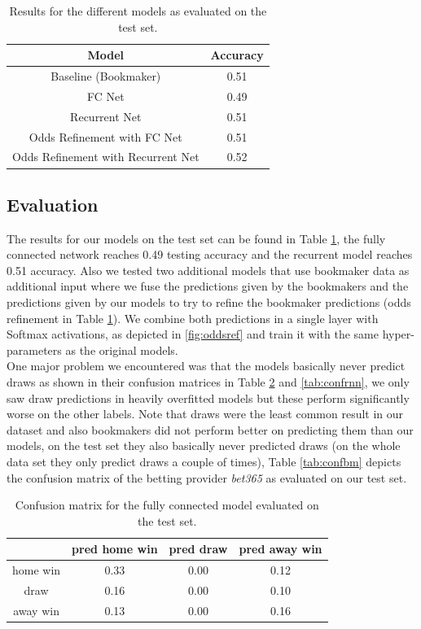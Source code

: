 \documentclass[a4paper]{article}
\begin{document}
\begin{table}
\begin{tabular}{|c|c|}
\hline 
\textbf{Model} & \textbf{Accuracy} \\ 
\hline 
\hline 
Baseline (Bookmaker) & 0.51 \\ 
\hline 
FC Net & 0.49 \\ 
\hline 
Recurrent Net & 0.51 \\ 
\hline 
Odds Refinement with FC Net & 0.51 \\ 
\hline 
Odds Refinement with Recurrent Net & 0.52 \\ 
\hline 
\end{tabular} 
\label{tab:accs}
\caption{Results for the different models as evaluated on the test set.}
\end{table}


\subsection{Evaluation}
The results for our models on the test set can be found in Table \ref{tab:accs},
the fully connected network reaches 0.49 testing accuracy and the recurrent
model reaches 0.51 accuracy. Also we tested two additional models that use
bookmaker data as additional input where we fuse the predictions given by the
bookmakers and the predictions given by our models to try to refine the
bookmaker predictions (odds refinement in Table \ref{tab:accs}). We combine both
predictions in a single layer with Softmax activations, as depicted in
\ref{fig:oddsref} and train it with the same hyper-parameters as the original
models. \\
One major problem we encountered was that the models basically never predict
draws as shown in their confusion matrices in Table \ref{tab:conffc} and
\ref{tab:confrnn}, we only saw draw predictions in heavily overfitted models but
these perform significantly worse on the other labels. Note that draws were the
least common result in our dataset and also bookmakers did not perform better on
predicting them than our models, on the test set they also basically never
predicted draws (on the whole data set they only predict draws a couple of
times), Table \ref{tab:confbm} depicts the confusion matrix of the betting
provider \textit{bet365} as evaluated on our test set.

\begin{table}
\begin{tabular}{|c||c|c|c|}
\hline 
 & pred home win & pred draw  & pred away win \\ 
\hline 
\hline
home win & 0.33 & 0.00 & 0.12 \\ 
\hline 
draw & 0.16 & 0.00 & 0.10 \\ 
\hline 
away win & 0.13 & 0.00 & 0.16 \\ 
\hline 
\end{tabular} 
\caption{Confusion matrix for the fully connected model evaluated on the test set.}
\label{tab:conffc}
\end{table}
\end{document}
